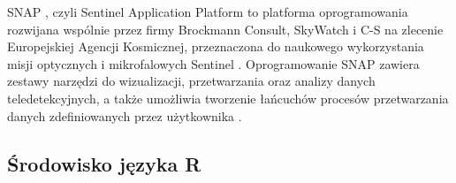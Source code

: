 \documentclass{amuthesis}
\begin{document}
SNAP \autocite{snap}, czyli Sentinel Application Platform to platforma
oprogramowania rozwijana wspólnie przez firmy Brockmann Consult,
SkyWatch i C-S na zlecenie Europejskiej Agencji Kosmicznej, przeznaczona
do naukowego wykorzystania misji optycznych i mikrofalowych Sentinel
\autocite{snap-desktop,esa_snap}. Oprogramowanie SNAP zawiera zestawy
narzędzi do wizualizacji, przetwarzania oraz analizy danych
teledetekcyjnych, a także umożliwia tworzenie łańcuchów procesów
przetwarzania danych zdefiniowanych przez użytkownika
\autocite{hejmanowska_2020_dane,moskolai_2022_s1_workflow}.

\hypertarget{ux15brodowisko-jux119zyka-r}{%
\subsection{Środowisko języka R}\label{ux15brodowisko-jux119zyka-r}}
\end{document}
